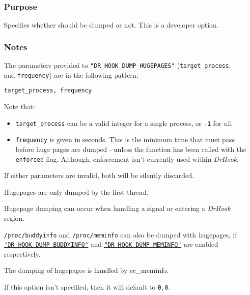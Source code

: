 \vspace{-2ex}
\subsubsection{Purpose}
\vspace{-2ex}
 Specifies whether  should be dumped or not. This is a developer option.

\vspace{-2ex}
\subsubsection{Notes}
\vspace{-2ex}
The parameters provided to \texttt{"DR\_HOOK\_DUMP\_HUGEPAGES"} (\verb|target_process|,\\ and \verb|frequency|) are in the following pattern:

\verb|target_process, frequency|

Note that:
\begin{itemize}
    \item \verb|target_process| can be a valid integer for a single process, or \texttt{-1} for all.
    \item \verb|frequency| is given in seconds. This is the minimum time that must pass before huge pages are dumped - unless the function has been called with the \texttt{enforced} flag. Although, enforcement isn't currently used within \textit{DrHook}.
\end{itemize}
If either parameters are invalid, both will be silently discarded.

Hugepages are only dumped by the first thread.

Hugepage dumping can occur when handling a signal or entering a \textit{DrHook} region.

\verb|/proc/buddyinfo| and \verb|/proc/meminfo| can also be dumped with hugepages, if \hyperref[section:flags:DR_HOOK_DUMP_BUDDYINFO]{\texttt{"DR\_HOOK\_DUMP\_BUDDYINFO"}} and \hyperref[section:flags:DR_HOOK_DUMP_MEMINFO]{\texttt{"DR\_HOOK\_DUMP\_MEMINFO"}} are enabled respectively.

The dumping of hugepages is handled by ec\_meminfo. 

If this option isn't specified, then it will default to \verb|0,0|.

